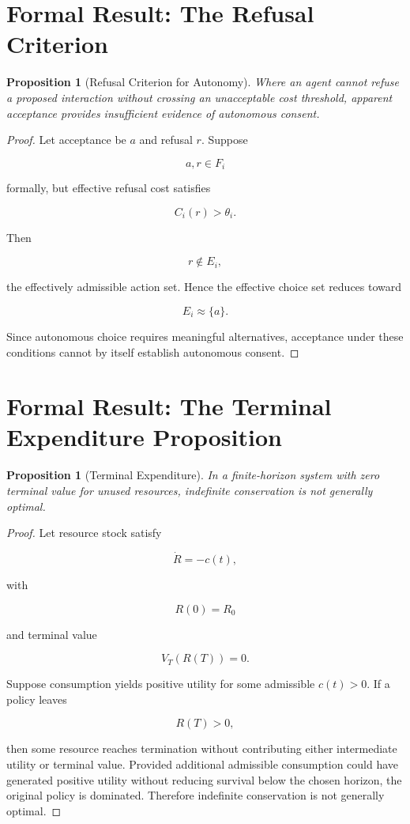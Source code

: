 \documentclass[11pt,oneside]{book}
\newtheorem{proposition}[theorem]{Proposition}
\theoremstyle{definition}
\theoremstyle{remark}
\begin{document}
\section{Formal Result: The Refusal Criterion}

\begin{proposition}[Refusal Criterion for Autonomy]
Where an agent cannot refuse a proposed interaction without crossing an unacceptable cost threshold, apparent acceptance provides insufficient evidence of autonomous consent.
\end{proposition}

\begin{proof}
Let acceptance be \(a\) and refusal \(r\). Suppose

\[
a,r\in F_i
\]

formally, but effective refusal cost satisfies

\[
C_i(r)>\theta_i.
\]

Then

\[
r\notin E_i,
\]

the effectively admissible action set. Hence the effective choice set reduces toward

\[
E_i\approx\{a\}.
\]

Since autonomous choice requires meaningful alternatives, acceptance under these conditions cannot by itself establish autonomous consent.
\end{proof}

\section{Formal Result: The Terminal Expenditure Proposition}

\begin{proposition}[Terminal Expenditure]
In a finite-horizon system with zero terminal value for unused resources, indefinite conservation is not generally optimal.
\end{proposition}

\begin{proof}
Let resource stock satisfy

\[
\dot R=-c(t),
\]

with

\[
R(0)=R_0
\]

and terminal value

\[
V_T(R(T))=0.
\]

Suppose consumption yields positive utility for some admissible \(c(t)>0\). If a policy leaves

\[
R(T)>0,
\]

then some resource reaches termination without contributing either intermediate utility or terminal value. Provided additional admissible consumption could have generated positive utility without reducing survival below the chosen horizon, the original policy is dominated. Therefore indefinite conservation is not generally optimal.
\end{proof}
\end{document}
